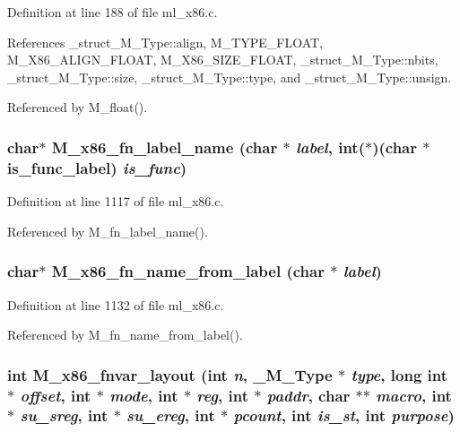 Definition at line 188 of file ml\_\-x86.c.

References \_\-struct\_\-M\_\-Type::align, M\_\-TYPE\_\-FLOAT, M\_\-X86\_\-ALIGN\_\-FLOAT, M\_\-X86\_\-SIZE\_\-FLOAT, \_\-struct\_\-M\_\-Type::nbits, \_\-struct\_\-M\_\-Type::size, \_\-struct\_\-M\_\-Type::type, and \_\-struct\_\-M\_\-Type::unsign.

Referenced by M\_\-float().
\subsubsection{\setlength{\rightskip}{0pt plus 5cm}char$\ast$ M\_\-x86\_\-fn\_\-label\_\-name (char $\ast$ {\em label}, int($\ast$)(char $\ast$is\_\-func\_\-label) {\em is\_\-func})}\label{ml__x86_8c_96ddee6be867fa3306d664e213890a41}




Definition at line 1117 of file ml\_\-x86.c.

Referenced by M\_\-fn\_\-label\_\-name().
\subsubsection{\setlength{\rightskip}{0pt plus 5cm}char$\ast$ M\_\-x86\_\-fn\_\-name\_\-from\_\-label (char $\ast$ {\em label})}\label{ml__x86_8c_ae7aef017d8df0e478a8ee19fab633ff}




Definition at line 1132 of file ml\_\-x86.c.

Referenced by M\_\-fn\_\-name\_\-from\_\-label().
\subsubsection{\setlength{\rightskip}{0pt plus 5cm}int M\_\-x86\_\-fnvar\_\-layout (int {\em n}, \bf{\_\-M\_\-Type} $\ast$ {\em type}, long int $\ast$ {\em offset}, int $\ast$ {\em mode}, int $\ast$ {\em reg}, int $\ast$ {\em paddr}, char $\ast$$\ast$ {\em macro}, int $\ast$ {\em su\_\-sreg}, int $\ast$ {\em su\_\-ereg}, int $\ast$ {\em pcount}, int {\em is\_\-st}, int {\em purpose})}\label{ml__x86_8c_f19e38bfc5705e30e3dbb4a8ce7c8175}




